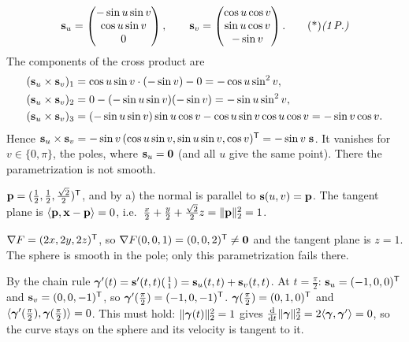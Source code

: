 \begin{solution}
\[
\vb s_u=\begin{pmatrix}-\sin u\sin v\\\cos u\sin v\\0\end{pmatrix},\qquad \vb s_v=\begin{pmatrix}\cos u\cos v\\\sin u\cos v\\-\sin v\end{pmatrix}.\ptd{1}
\]
The components of the cross product are
\begin{align*}
(\mathbf{s}_u\times\mathbf{s}_v)_1&=\cos u\sin v\cdot(-\sin v)-0=-\cos u\sin^2v,\\
(\mathbf{s}_u\times\mathbf{s}_v)_2&=0-(-\sin u\sin v)(-\sin v)=-\sin u\sin^2v,\\
(\mathbf{s}_u\times\mathbf{s}_v)_3&=(-\sin u\sin v)\sin u\cos v-\cos u\sin v\cos u\cos v=-\sin v\cos v.
\end{align*}
Hence $\mathbf{s}_u\times\mathbf{s}_v=-\sin v\,(\cos u\sin v,\sin u\sin v,\cos v)^{\mathsf{T}}=-\sin v\;\mathbf{s}$. 
It vanishes for $v\in\{0,\pi\}$, the poles, where $\mathbf{s}_u=\mathbf{0}$ (and all $u$ give the same point). There the parametrization is not smooth. 

 $\mathbf{p}=(\frac12,\frac12,\frac{\sqrt2}2)^{\mathsf{T}}$, and by a) the normal is parallel to $\mathbf{s}(u,v)=\mathbf{p}$. 
The tangent plane is $\langle \mathbf{p},\mathbf{x}-\mathbf{p}\rangle=0$, i.e.\ $\frac x2+\frac y2+\frac{\sqrt2}2z=\lVert \mathbf{p}\rVert_2^2=1$. 

 $\nabla F=(2x,2y,2z)^{\mathsf{T}}$, so $\nabla F(0,0,1)=(0,0,2)^{\mathsf{T}}\neq\mathbf{0}$ and the tangent plane is $z=1$. The sphere is smooth in the pole; only this parametrization fails there. 

 By the chain rule $\boldsymbol\gamma'(t)=\mathbf{s}'(t,t)\begin{psmallmatrix}1\\1\end{psmallmatrix}=\mathbf{s}_u(t,t)+\mathbf{s}_v(t,t)$. At $t=\frac\pi2$: $\mathbf{s}_u=(-1,0,0)^{\mathsf{T}}$ and $\mathbf{s}_v=(0,0,-1)^{\mathsf{T}}$, so $\boldsymbol\gamma'(\frac\pi2)=(-1,0,-1)^{\mathsf{T}}$. 
$\boldsymbol\gamma(\frac\pi2)=(0,1,0)^{\mathsf{T}}$ and $\langle \boldsymbol\gamma'(\frac\pi2),\boldsymbol\gamma(\frac\pi2)\rangle=0$. This must hold: $\lVert \boldsymbol\gamma(t)\rVert_2^2=1$ gives $\frac{\mathrm d}{\mathrm dt}\lVert \boldsymbol\gamma\rVert_2^2=2\langle \boldsymbol\gamma,\boldsymbol\gamma'\rangle=0$, so the curve stays on the sphere and its velocity is tangent to it. 


\end{solution}
